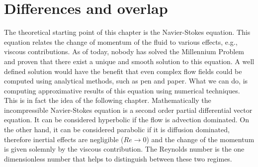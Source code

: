 \section{Differences and overlap}
\label{sec:shallow_to_thin}
The theoretical starting point of this chapter is the Navier-Stokes equation.
This equation relates the change of momentum of the fluid to various effects, e.g., viscous contributions. 
As of today, nobody has solved the Millennium Problem and proven that there exist a unique and smooth solution to this equation.
A well defined solution would have the benefit that even complex flow fields could be computed using analytical methods, such as pen and paper.
What we can do, is computing approximative results of this equation using numerical techniques.
This is in fact the idea of the following chapter.
Mathematically the incompressible Navier-Stokes equation is a second order partial differential vector equation. 
It can be considered hyperbolic if the flow is advection dominated. 
On the other hand, it can be considered parabolic if it is diffusion dominated, therefore inertial effects are negligible ($Re\rightarrow 0$) and the change of the momentum is given solemnly by the viscous contribution.
The Reynolds number is the one dimensionless number that helps to distinguish between these two regimes. 

